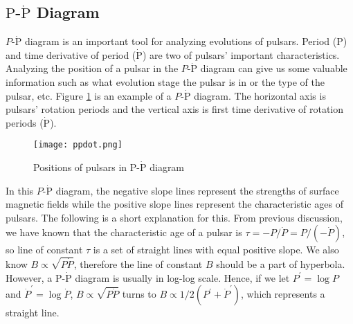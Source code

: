 \documentclass[12pt]{report}
\begin{document}
    \subsection{$\mbox{P}$-$\dot{\mbox{P}}$ Diagram} 
      $P$-$\dot{\mbox{P}}$ diagram is an important tool for analyzing evolutions of 
      pulsars. Period ($\mbox{P}$) and time derivative of period ($\dot{\mbox{P}}$) are 
      two of pulsars' important characteristics. Analyzing the position of a pulsar in 
      the $P$-$\dot{\mbox{P}}$ diagram can give us some valuable information such as 
      what evolution stage the pulsar is in or the type of the pulsar, etc. 
      Figure \ref{fig:p-pdot} is an example of a $P$-$\dot{\mbox{P}}$ diagram. 
      The horizontal axis is pulsars' rotation periods and the vertical axis is first time 
      derivative of rotation periods ($\dot{\mbox{P}}$).
      \begin{figure}[!htp]
          \centering
          \texttt{[image: ppdot.png]}
          \caption{\protect Positions of pulsars in $\mbox{P}$-$\dot{\mbox{P}}$ diagram}
          \label{fig:p-pdot}
      \end{figure}
      In this $P$-$\dot{\mbox{P}}$ diagram, the negative slope lines represent the strengths 
      of surface magnetic fields while the positive slope lines represent the characteristic 
      ages of pulsars. The following is a short explanation for this. 
      From previous discussion, we have known that the 
      characteristic age of a pulsar is $\tau=-P/\dot{P}=P/(-\dot{P})$, so line of constant 
      $\tau$ is a set of straight lines with equal positive slope. We also know 
      $B\propto\sqrt{P\dot{P}}$, therefore the line of constant $B$ should be a part 
      of hyperbola. However, a $\mbox{P}$-$\dot{\mbox{P}}$ diagram is usually in log-log 
      scale. Hence, if we let $P^{\prime}=\log{P}$ and $\dot{P}^{\prime}=\log{\dot{P}}$,
      $B\propto\sqrt{P\dot{P}}$ turns to 
      $B\propto 1/2 \left(P^{\prime} + \dot{P}^{\prime}\right)$, 
      which represents a straight line.
\end{document}
